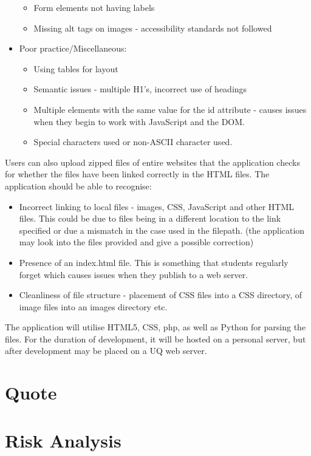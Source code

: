 \documentclass[12pt]{article}
\begin{document}
\begin{itemize}
\begin{itemize}
\item Form elements not having labels
\item Missing alt tags on images - accessibility standards not followed
\end{itemize}
\item Poor practice/Miscellaneous:
\begin{itemize}
\item Using tables for layout
\item Semantic issues - multiple H1's, incorrect use of headings
\item Multiple elements with the same value for the id attribute - causes issues when they begin to work with JavaScript and the DOM.
\item Special characters used or non-ASCII character used.
\end{itemize}\end{itemize}

Users can also upload zipped files of entire websites that the application checks for whether the files have been linked correctly in the HTML files. The application should be able to recognise: 
\begin{itemize}
\item Incorrect linking to local files - images, CSS, JavaScript and other HTML files. This could be due to files being in a different location to the link specified or due a mismatch in the case used in the filepath. (the application may look into the files provided and give a possible correction)
\item  Presence of an index.html file. This is something that students regularly forget which causes issues when they publish to a web server.
\item  Cleanliness of file structure - placement of CSS files into a CSS directory, of image files into an images directory etc.
\end{itemize}

The application will utilise HTML5, CSS, php, as well as Python for parsing the files. For the duration of development, it will be hosted on a personal server, but after development may be placed on a UQ web server.

\section*{Quote}

\section*{Risk Analysis}
\end{document}
